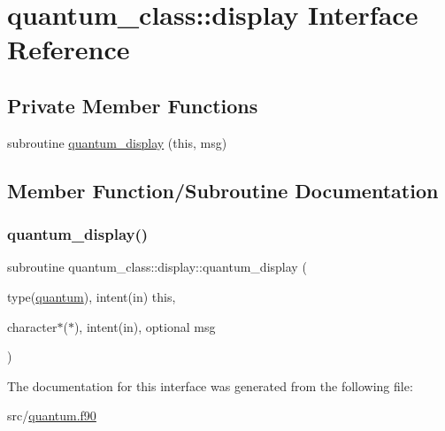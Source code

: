 \hypertarget{interfacequantum__class_1_1display}{}\section{quantum\+\_\+class\+:\+:display Interface Reference}
\label{interfacequantum__class_1_1display}
\subsection*{Private Member Functions}
\begin{DoxyCompactItemize}
\item 
subroutine \hyperlink{interfacequantum__class_1_1display_ac7c738dc00158d70772a5930d1dab58e}{quantum\+\_\+display} (this, msg)
\end{DoxyCompactItemize}


\subsection{Member Function/\+Subroutine Documentation}
\mbox{\label{interfacequantum__class_1_1display_ac7c738dc00158d70772a5930d1dab58e}} 
\subsubsection{\texorpdfstring{quantum\+\_\+display()}{quantum\_display()}}
{\footnotesize\ttfamily subroutine quantum\+\_\+class\+::display\+::quantum\+\_\+display (\begin{DoxyParamCaption}\item[{type(\hyperlink{structquantum__class_1_1quantum}{quantum}), intent(in)}]{this,  }\item[{character$\ast$($\ast$), intent(in), optional}]{msg }\end{DoxyParamCaption})\hspace{0.3cm}{\ttfamily [private]}}



The documentation for this interface was generated from the following file\+:\begin{DoxyCompactItemize}
\item 
src/\hyperlink{quantum_8f90}{quantum.\+f90}\end{DoxyCompactItemize}

